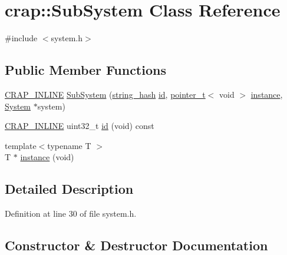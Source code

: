 \hypertarget{classcrap_1_1_sub_system}{}\section{crap\+:\+:Sub\+System Class Reference}
\label{classcrap_1_1_sub_system}


{\ttfamily \#include $<$system.\+h$>$}

\subsection*{Public Member Functions}
\begin{DoxyCompactItemize}
\item 
\hyperlink{config__x86_8h_a5a40526b8d842e7ff731509998bb0f1c}{C\+R\+A\+P\+\_\+\+I\+N\+L\+I\+N\+E} \hyperlink{classcrap_1_1_sub_system_a9609977e3ff95c12ec24a23a39e9c7ef}{Sub\+System} (\hyperlink{classcrap_1_1string__hash}{string\+\_\+hash} \hyperlink{classcrap_1_1_sub_system_a26b030d65b9773bc1e96f8ae1e2ad18a}{id}, \hyperlink{structcrap_1_1pointer__t}{pointer\+\_\+t}$<$ void $>$ \hyperlink{classcrap_1_1_sub_system_a94590b9989e144eee6718fd5150d2732}{instance}, \hyperlink{classcrap_1_1_system}{System} $\ast$system)
\item 
\hyperlink{config__x86_8h_a5a40526b8d842e7ff731509998bb0f1c}{C\+R\+A\+P\+\_\+\+I\+N\+L\+I\+N\+E} uint32\+\_\+t \hyperlink{classcrap_1_1_sub_system_a26b030d65b9773bc1e96f8ae1e2ad18a}{id} (void) const 
\item 
{\footnotesize template$<$typename T $>$ }\\T $\ast$ \hyperlink{classcrap_1_1_sub_system_a94590b9989e144eee6718fd5150d2732}{instance} (void)
\end{DoxyCompactItemize}


\subsection{Detailed Description}


Definition at line 30 of file system.\+h.



\subsection{Constructor \& Destructor Documentation}
\hypertarget{classcrap_1_1_sub_system_a9609977e3ff95c12ec24a23a39e9c7ef}{}
